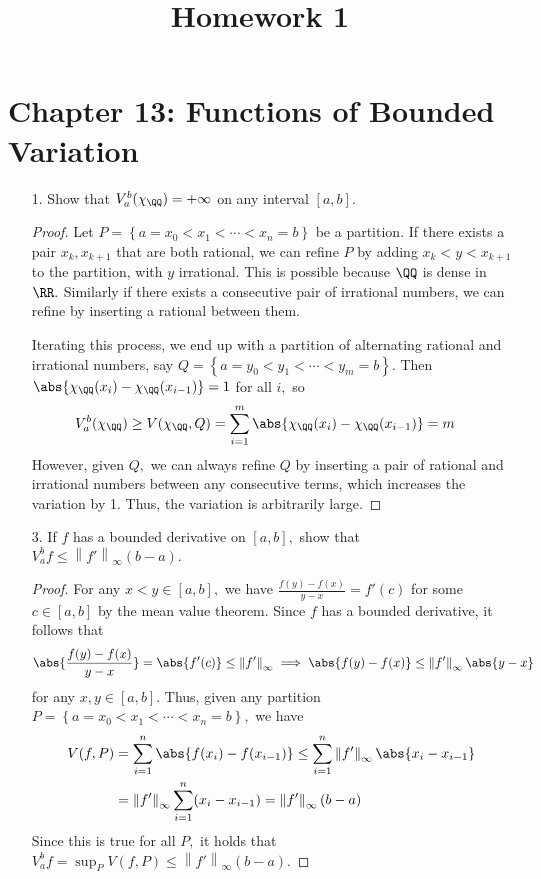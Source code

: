 \documentclass{article}
\begin{document}
\title{Homework 1}
\maketitle
\thispagestyle{fancy}

\section*{Chapter 13: Functions of Bounded Variation}

\begin{itemize}
	\item[1.] Show that $V_a^b(\chi_\QQ)=+\infty$ on any interval $[a, b].$
		\begin{proof}
			Let $P=\left\{ a=x_0<x_1<\cdots<x_n=b \right\}$ be a partition. If there exists a pair $x_k, x_{k+1}$ that are both rational, we can refine $P$ by adding $x_k<y<x_{k+1}$ to the partition, with $y$ irrational. This is possible because $\QQ$ is dense in $\RR.$ Similarly if there exists a consecutive pair of irrational numbers, we can refine by inserting a rational between them. 

			Iterating this process, we end up with a partition of alternating rational and irrational numbers, say $Q=\left\{ a=y_0<y_1<\cdots<y_m = b \right\}.$ Then $\abs{\chi_\QQ(x_i)-\chi_\QQ(x_{i-1})}=1$ for all $i,$ so
			\begin{align*}
				V_a^b (\chi_\QQ) &\ge V(\chi_\QQ, Q) = \sum_{i=1}^{m} \abs{\chi_\QQ(x_i)-\chi_\QQ(x_{i-1})} = m
			\end{align*}
			However, given $Q,$ we can always refine $Q$ by inserting a pair of rational and irrational numbers between any consecutive terms, which increases the variation by 1. Thus, the variation is arbitrarily large.
		\end{proof}

	\item[3.] If $f$ has a bounded derivative on $[a, b],$ show that $V_a^b f\le \left\lVert f' \right\rVert_\infty(b-a).$
		\begin{proof}
			For any $x<y\in [a, b],$ we have $\frac{f(y)-f(x)}{y-x} = f'(c)$ for some $c\in [a, b]$ by the mean value theorem. Since $f$ has a bounded derivative, it follows that 
			\begin{align*}
				\abs{\frac{f(y)-f(x)}{y-x}} =\abs{f'(c)} \le \left\lVert f' \right\rVert_\infty \implies \abs{f(y)-f(x)}\le \left\lVert f' \right\rVert_\infty \abs{y-x}
			\end{align*}
			for any $x, y\in [a, b].$ Thus, given any partition $P=\left\{ a=x_0<x_1<\cdots < x_n=b \right\},$ we have
			\begin{align*}
				V(f, P) &= \sum_{i=1}^{n} \abs{f(x_i)-f(x_{i-1})} \le \sum_{i=1}^{n} \left\lVert f' \right\rVert_\infty\abs{x_i-x_{i-1}} \\
				&= \left\lVert f' \right\rVert_\infty \sum_{i=1}^{n} (x_i-x_{i-1}) = \left\lVert f' \right\rVert_\infty (b-a)
			\end{align*}
			Since this is true for all $P,$ it holds that $V_a^b f = \sup_P V(f, P)\le \left\lVert f' \right\rVert_\infty (b-a).$
		\end{proof}


\end{itemize}
\end{document}
